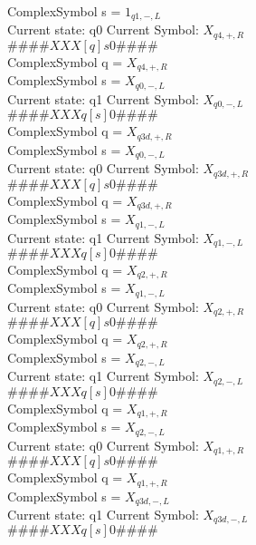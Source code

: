 \documentclass[10pt, a4paper]{article}
\begin{document}
ComplexSymbol s = $1_{q1,-,L}$ \\ 
 \medskip
Current state: q0	 Current Symbol: 	 $X_{q4,+,R}$\\
$\# \#\# \# X X X [ q ] s 0 \# \# \# \# $ \\
ComplexSymbol q = $X_{q4,+,R}$ \\
ComplexSymbol s = $X_{q0,-,L}$ \\ 
 \medskip
Current state: q1	 Current Symbol: 	 $X_{q0,-,L}$\\
$\# \#\# \# X X X q [ s ] 0 \# \# \# \# $ \\
ComplexSymbol q = $X_{q3d,+,R}$ \\
ComplexSymbol s = $X_{q0,-,L}$ \\ 
 \medskip
Current state: q0	 Current Symbol: 	 $X_{q3d,+,R}$\\
$\# \#\# \# X X X [ q ] s 0 \# \# \# \# $ \\
ComplexSymbol q = $X_{q3d,+,R}$ \\
ComplexSymbol s = $X_{q1,-,L}$ \\ 
 \medskip
Current state: q1	 Current Symbol: 	 $X_{q1,-,L}$\\
$\# \#\# \# X X X q [ s ] 0 \# \# \# \# $ \\
ComplexSymbol q = $X_{q2,+,R}$ \\
ComplexSymbol s = $X_{q1,-,L}$ \\ 
 \medskip
Current state: q0	 Current Symbol: 	 $X_{q2,+,R}$\\
$\# \#\# \# X X X [ q ] s 0 \# \# \# \# $ \\
ComplexSymbol q = $X_{q2,+,R}$ \\
ComplexSymbol s = $X_{q2,-,L}$ \\ 
 \medskip
Current state: q1	 Current Symbol: 	 $X_{q2,-,L}$\\
$\# \#\# \# X X X q [ s ] 0 \# \# \# \# $ \\
ComplexSymbol q = $X_{q1,+,R}$ \\
ComplexSymbol s = $X_{q2,-,L}$ \\ 
 \medskip
Current state: q0	 Current Symbol: 	 $X_{q1,+,R}$\\
$\# \#\# \# X X X [ q ] s 0 \# \# \# \# $ \\
ComplexSymbol q = $X_{q1,+,R}$ \\
ComplexSymbol s = $X_{q3d,-,L}$ \\ 
 \medskip
Current state: q1	 Current Symbol: 	 $X_{q3d,-,L}$\\
$\# \#\# \# X X X q [ s ] 0 \# \# \# \# $ \\
\end{document}
